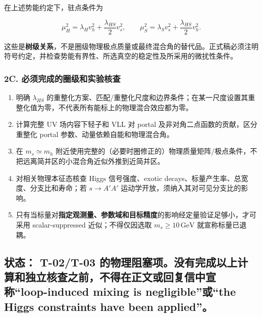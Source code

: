\documentclass[
]{article}
\providecommand{\tightlist}{%
  \setlength{\itemsep}{0pt}\setlength{\parskip}{0pt}}
\begin{document}
在上述势能约定下，驻点条件为

\[
\mu_H^2=\lambda_Hv_h^2+\frac{\lambda_{HS}}{2}v_s^2,\qquad
\mu_S^2=\lambda_Sv_s^2+\frac{\lambda_{HS}}{2}v_h^2.
\]

这些是\textbf{树级关系}，不是圈级物理极点质量或最终混合角的替代品。正式稿必须注明符号约定，并检查势能有界性、所选真空的稳定性及所采用的微扰性条件。

\subsubsection{2C.
必须完成的圈级和实验核查}\label{c.-ux5fc5ux987bux5b8cux6210ux7684ux5708ux7ea7ux548cux5b9eux9a8cux6838ux67e5}

\begin{enumerate}
\def\labelenumi{\arabic{enumi}.}
\tightlist
\item
  明确 \(\lambda_{HS}\)
  的重整化方案、匹配/重整化尺度和边界条件；在某一尺度设置其重整化值为零，不代表所有能标上的物理混合效应都为零。
\item
  计算完整 UV 场内容下轻子和 VLL 对 portal
  及非对角二点函数的贡献，区分重整化 portal
  参数、动量依赖自能和物理混合角。
\item
  在 \(m_s\simeq m_h\)
  附近使用完整的（必要时圈修正的）物理质量矩阵/极点条件，不把远离简并区的小混合角近似外推到近简并区。
\item
  对相关物理本征态核查 Higgs 信号强度、exotic
  decays、标量产生率、总宽度、分支比和寿命；若 \(s\to A'A'\)
  运动学开放，须纳入其对可见分支比的影响。
\item
  只有当标量对\textbf{指定观测量、参数域和目标精度}的影响经定量验证足够小，才可采用
  scalar-suppressed 近似；不得仅因选取 \(m_s\geq10\,\mathrm{GeV}\)
  就宣称标量已退耦。
\end{enumerate}

\subsection{\texorpdfstring{\textbf{状态：} T-02/T-03
的物理阻塞项。没有完成以上计算和独立核查之前，不得在正文或回复信中宣称``loop-induced
mixing is negligible''或``the Higgs constraints have been
applied''。}{状态： T-02/T-03 的物理阻塞项。没有完成以上计算和独立核查之前，不得在正文或回复信中宣称``loop-induced mixing is negligible''或``the Higgs constraints have been applied''。}}\label{ux72b6ux6001-t-02t-03-ux7684ux7269ux7406ux963bux585eux9879ux6ca1ux6709ux5b8cux6210ux4ee5ux4e0aux8ba1ux7b97ux548cux72ecux7acbux6838ux67e5ux4e4bux524dux4e0dux5f97ux5728ux6b63ux6587ux6216ux56deux590dux4fe1ux4e2dux5ba3ux79f0loop-induced-mixing-is-negligibleux6216the-higgs-constraints-have-been-applied}
\end{document}
